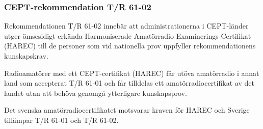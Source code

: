 \subsubsection{CEPT-rekommendation T/R 61-02}

Rekommendationen T/R 61-02 \cite{TR6102} innebär att administrationerna i
CEPT-länder utger ömsesidigt erkända Harmoniserade Amatörradio Examinerings
Certifikat (HAREC) till de personer som vid nationella prov uppfyller
rekommendationens kunskapskrav.

Radioamatörer med ett CEPT-certifikat (HAREC) får utöva amatörradio i annat land
som accepterat T/R 61-01 och får tilldelas ett amatörradiocertifikat av det
landet utan att behöva genomgå ytterligare kunskapsprov.

Det svenska amatörradiocertifikatet motsvarar kraven för HAREC och Sverige
tillämpar T/R 61-01 och T/R 61-02.
